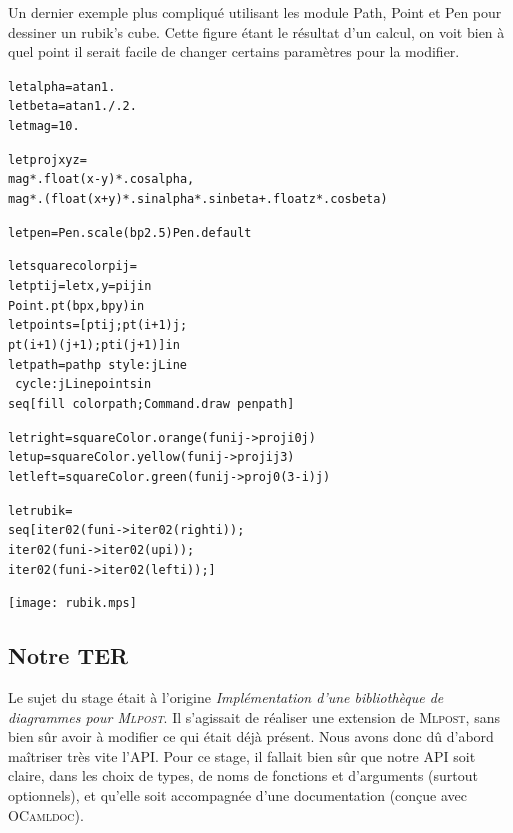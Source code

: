 \documentclass[a4paper,12pt]{article}
\newcommand{\mlpost}{\textsc{Mlpost}}
\begin{document}
Un dernier exemple plus compliqué utilisant les module Path, Point et Pen pour dessiner un rubik's cube. Cette figure étant le résultat d'un calcul, on voit bien à quel point il serait facile de changer certains paramètres pour la modifier.
\bigskip 

\begin{minipage}{0.7\linewidth}
  \begin{alltt}
    let alpha = atan 1.
    let beta = atan 1. /. 2. 
    let mag = 10.
    
    let proj x y z = 
    mag *. float (x - y) *. cos alpha, 
    mag *. (float (x + y) *. sin alpha *. sin beta +. float z *. cos beta)
    
    let pen = Pen.scale (bp 2.5) Pen.default
  
    let square color p i j =
    let pt i j = let x,y = p i j in 
    Point.pt (bp x, bp y) in
    let points = [pt i j; pt (i+1) j; 
      pt (i+1) (j+1); pt i (j+1)] in
    let path = pathp ~style:jLine 
    ~cycle:jLine points in
    seq [fill ~color path; Command.draw ~pen path]
    
    let right = square Color.orange (fun i j -> proj i 0 j)
    let up = square Color.yellow (fun i j -> proj i j 3)
    let left = square Color.green (fun i j -> proj 0 (3 - i) j)
    
    let rubik = 
    seq [iter 0 2 (fun i -> iter 0 2 (right i));
      iter 0 2 (fun i -> iter 0 2 (up i));
      iter 0 2 (fun i -> iter 0 2 (left i));]
  \end{alltt}
\end{minipage}
\begin{minipage}{0.3\linewidth}
  \begin{center}
    \texttt{[image: rubik.mps]}
  \end{center}
\end{minipage}

\subsection{Notre TER}
Le sujet du stage était à l'origine \textit{Implémentation d'une
  bibliothèque de diagrammes pour \mlpost}. Il s'agissait de réaliser une extension de \mlpost, sans bien sûr avoir à modifier ce qui était déjà présent. Nous avons donc dû d'abord maîtriser très vite l'API.
Pour ce stage, il fallait bien sûr que notre API soit claire, dans les choix de types, de noms de fonctions et d'arguments (surtout optionnels), et qu'elle soit accompagnée d'une documentation (conçue avec \textsc{OCamldoc}).
\end{document}
